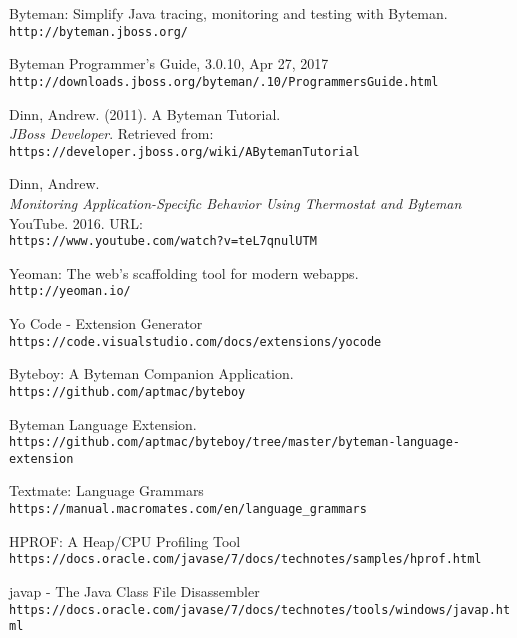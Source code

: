 \documentclass[letterpaper,twocolumn,10pt]{article}
\begin{document}
\begin{thebibliography}{99}

Byteman: Simplify Java tracing, monitoring and testing with Byteman.
\\\texttt{http://byteman.jboss.org/}

Byteman Programmer's Guide, 3.0.10, Apr 27, 2017
\\\texttt{http://downloads.jboss.org/byteman/.10/ProgrammersGuide.html}

Dinn, Andrew. (2011). A Byteman Tutorial. 
\\\textit{JBoss Developer}. Retrieved from: \\\texttt{https://developer.jboss.org/wiki/\newline ABytemanTutorial}

Dinn, Andrew. \\\textit{Monitoring Application-Specific Behavior Using Thermostat and Byteman}
YouTube. 2016. URL: \\\texttt{https://www.youtube.com/watch?v=teL7qnulUTM}

Yeoman: The web's scaffolding tool for modern webapps.
\\\texttt{http://yeoman.io/}

Yo Code - Extension Generator
\\\texttt{https://code.visualstudio.com/docs/\newline extensions/yocode}

Byteboy: A Byteman Companion Application.
\\\texttt{https://github.com/aptmac/byteboy}

Byteman Language Extension.
\\\texttt{https://github.com/aptmac/byteboy/tree/\newline master/byteman-language-extension}

Textmate: Language Grammars
\\\texttt{https://manual.macromates.com/en/\newline language\_grammars}

HPROF: A Heap/CPU Profiling Tool
\\\texttt{https://docs.oracle.com/javase/7/\newline docs/technotes/samples/hprof.html}

javap - The Java Class File Disassembler
\\\texttt{https://docs.oracle.com/javase/7/\newline docs/technotes/tools/windows/javap.html}

\end{thebibliography}
\end{document}
